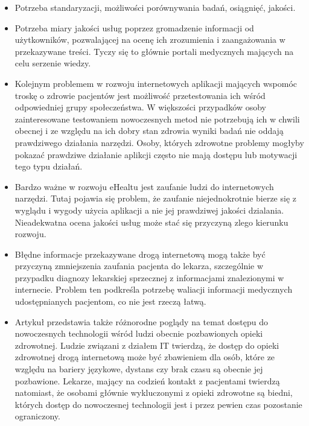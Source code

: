 \documentclass[a4paper,10pt]{article}
\begin{document}
\begin{itemize}
\item Potrzeba standaryzacji, możliwości porównywania badań, osiągnięć, jakości.
\item Potrzeba miary jakości usług poprzez gromadzenie informacji od użytkowników, pozwalającej na ocenę ich zrozumienia i zaangażowania w przekazywane treści. Tyczy się to głównie
portali medycznych mających na celu serzenie wiedzy.
\item Kolejnym problemem w rozwoju internetowych aplikacji mających wspomóc troskę o zdrowie pacjentów jest możliwość przetestowania ich wśród odpowiedniej grupy społeczeństwa. W większości
przypadków osoby zainteresowane testowaniem nowoczesnych metod nie potrzebują ich w chwili obecnej i ze względu na ich dobry stan zdrowia wyniki badań nie oddają prawdziwego działania narzędzi.
Osoby, których zdrowotne problemy mogłyby pokazać prawdziwe działanie aplikcji często nie mają dostępu lub motywacji tego typu działań.
\item Bardzo ważne w rozwoju eHealtu jest zaufanie ludzi do internetowych narzędzi. Tutaj pojawia się problem, że zaufanie niejednokrotnie bierze się z wyglądu i wygody użycia aplikacji
a nie jej prawdziwej jakości dzialania. Nieadekwatna ocena jakości usług może stać się przyczyną zlego kierunku rozwoju. 
\item Błędne informacje przekazywane drogą internetową mogą także być przyczyną zmniejszenia zaufania pacjenta do lekarza, szczególnie w przypadku diagnozy lekarskiej sprzecznej z informacjami znalezionymi
w internecie. Problem ten podkreśla potrzebę waliacji informacji medycznych udostępnianych pacjentom, co nie jest rzeczą łatwą. 
\item Artykuł przedstawia także różnorodne poglądy na temat dostępu do nowoczesnych technologii wśród ludzi obecnie pozbawionych opieki zdrowotnej.
Ludzie związani z działem IT twierdzą, że dostęp do opieki zdrowotnej drogą internetową może być zbawieniem dla osób, które ze względu na bariery językowe, dystans czy brak czasu są obecnie jej 
pozbawione. Lekarze, mający na codzień kontakt z pacjentami twierdzą natomiast, że osobami głównie wykluczonymi z opieki zdrowotne są biedni, których dostęp do nowoczesnej technologii jest i 
przez pewien czas pozostanie ograniczony. 
\end{itemize}
\end{document}
